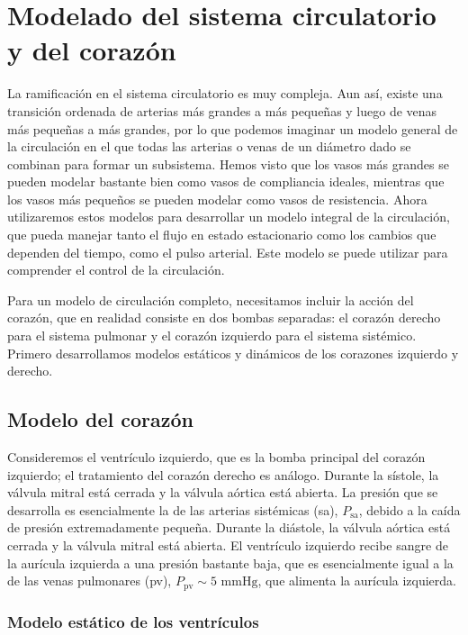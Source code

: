 \documentclass[12pt]{book}
\begin{document}
\section{Modelado del sistema circulatorio y del corazón}

La ramificación en el sistema circulatorio es muy compleja. Aun así, existe una transición ordenada de arterias más grandes a más pequeñas y luego de venas más pequeñas a más grandes, por lo que podemos imaginar un modelo general de la circulación en el que todas las arterias o venas de un diámetro dado se combinan para formar un subsistema. Hemos visto que los vasos más grandes se pueden modelar bastante bien como vasos de compliancia ideales, mientras que los vasos más pequeños se pueden modelar como vasos de resistencia. Ahora utilizaremos estos modelos para desarrollar un modelo integral de la circulación, que pueda manejar tanto el flujo en estado estacionario como los cambios que dependen del tiempo, como el pulso arterial. Este modelo se puede utilizar para comprender el control de la circulación.

Para un modelo de circulación completo, necesitamos incluir la acción del corazón, que en realidad consiste en dos bombas separadas: el corazón derecho para el sistema pulmonar y el corazón izquierdo para el sistema sistémico. Primero desarrollamos modelos estáticos y dinámicos de los corazones izquierdo y derecho.

\subsection{Modelo del corazón}

Consideremos el ventrículo izquierdo, que es la bomba principal del corazón izquierdo; el tratamiento del corazón derecho es análogo. Durante la sístole, la válvula mitral está cerrada y la válvula aórtica está abierta. La presión que se desarrolla es esencialmente la de las arterias sistémicas (sa), $P_{\text{sa}}$, debido a la caída de presión extremadamente pequeña. Durante la diástole, la válvula aórtica está cerrada y la válvula mitral está abierta. El ventrículo izquierdo recibe sangre de la aurícula izquierda a una presión bastante baja, que es esencialmente igual a la de las venas pulmonares (pv), $P_{\text{pv}} \sim 5\text{ mmHg}$, que alimenta la aurícula izquierda.

\subsubsection*{Modelo estático de los ventrículos}
\end{document}
